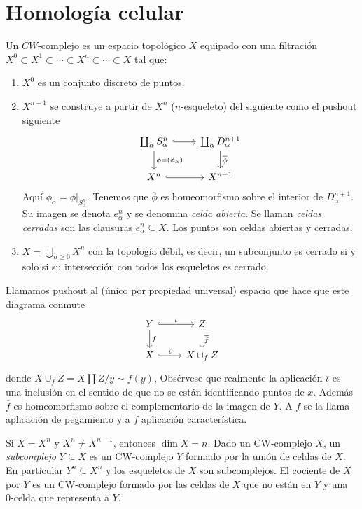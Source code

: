 \documentclass[TA.tex]{subfiles}
\begin{document}
\section{Homología celular}
\begin{defi}
Un $CW$-complejo es un espacio topológico $X$ equipado con una filtración $X^0\subset X^1\subset\cdots \subset X^n\subset\cdots\subset X$ tal que:
\begin{enumerate}
\item $X^0$ es un conjunto discreto de puntos. 
\item $X^{n+1}$ se construye a partir de $X^n$ ($n$-esqueleto) del siguiente como el pushout siguiente
\[
\begin{tikzcd}
\coprod_{\alpha}S^n_{\alpha}\arrow[r, hookrightarrow]\arrow[d, "\phi=(\phi_{\alpha})"] & \coprod_{\alpha}D^{n+1}_{\alpha}\arrow[d, "\overline{\phi}"]\\
X^n\arrow[r, hookrightarrow] & X^{n+1}
\end{tikzcd}
\]
Aquí $\phi_\alpha=\phi|_{S^n_{\alpha}}$. Tenemos que $\overline{\phi}$ es homeomorfismo sobre el interior de $D_{\alpha}^{n+1}$. Su imagen se denota $e^n_{\alpha}$ y se denomina \emph{celda abierta}. Se llaman \emph{celdas cerradas} son las clausuras $\overline{e}^n_{\alpha}\subseteq X$.  Los puntos son celdas abiertas y cerradas. 
\item $X=\bigcup_{n\geq 0} X^n$ con la topología débil, es decir, un subconjunto es cerrado si y solo si su intersección con todos los esqueletos es cerrado. 
\end{enumerate}
\end{defi}

Llamamos pushout al (único por propiedad universal) espacio que hace que este diagrama conmute
\[
\begin{tikzcd}
Y\arrow[r, hookrightarrow, "\iota"]\arrow[d, "f"] & Z\arrow[d, "\overline{f}"]\\
X\arrow[r, hookrightarrow, "\overline{\iota}"] & X\cup_f Z
\end{tikzcd}
\]
donde $X\cup_f Z=X\coprod Z/y\sim f(y)$, Obsérvese que realmente la aplicación $\overline{\iota}$ es una inclusión en el sentido de que no se están identificando puntos de $x$. Además $\overline{f}$ es homeomorfismo sobre el complementario de la imagen de $Y$. A $f$ se la llama aplicación de pegamiento y a $\overline{f}$ aplicación característica. 

Si $X=X^n$ y $X^n\neq X^{n-1}$, entonces $\dim X=n$. Dado un CW-complejo $X$, un \emph{subcomplejo} $Y\subseteq X$ es un CW-complejo $Y$ formado por la unión de celdas de $X$. En particular $Y^n\subseteq X^n$ y los esqueletos de $X$ son subcomplejos. El cociente de $X$ por $Y$ es un CW-complejo formado por las celdas de $X$ que no están en $Y$ y una 0-celda que representa a $Y$.
\end{document}
